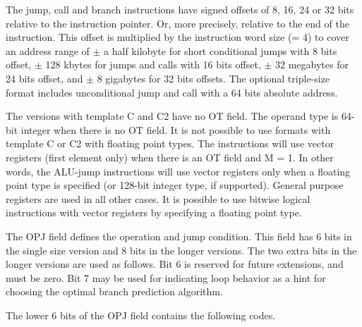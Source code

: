 \documentclass[forwardcom.tex]{subfiles}
\begin{document}
The jump, call and branch instructions have signed offsets of 8, 16, 24 or 32 bits relative to the instruction pointer. Or, more precisely, relative to the end of the instruction. This offset is multiplied by the instruction word size (= 4) to cover an address range of $\pm$ a half kilobyte for short conditional jumps with 8 bits offset, $\pm$ 128 kbytes for jumps and calls with 16 bits offset, $\pm$ 32 megabytes for 24 bits offset, and $\pm$ 8 gigabytes for 32 bits offsets. The optional triple-size format includes unconditional jump and call with a 64 bits absolute address.
\vspace{2mm}

The versions with template C and C2 have no OT field. The operand type is 64-bit integer when there is no OT field. It is not possible to use formats with template C or C2 with floating point types. The instructions will use vector registers (first element only) when there is an OT field and M = 1. In other words, the ALU-jump instructions will use vector registers only when a floating point type is specified (or 128-bit integer type, if supported). General purpose registers are used in all other cases. It is possible to use bitwise logical instructions with vector registers by specifying a floating point type. 
\vspace{2mm}

The OPJ field defines the operation and jump condition. This field has 6 bits in the single size version and 8 bits in the longer versions. The two extra bits in the longer versions are used as follows. Bit 6 is reserved for future extensions, and must be zero. Bit 7 may be used for indicating loop behavior as a hint for choosing the optimal branch prediction algorithm.
\vspace{2mm}

The lower 6 bits of the OPJ field contains the following codes.
\end{document}
